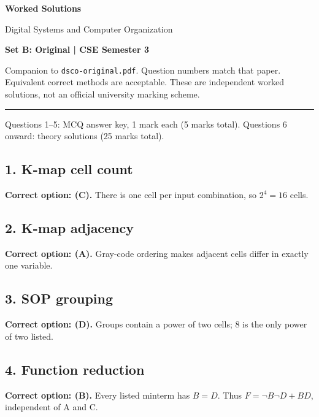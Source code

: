 \documentclass[11pt,a4paper]{article}
\begin{document}
{\LARGE\bfseries Worked Solutions}\par{\large Digital Systems and Computer Organization}\par\textbf{Set B: Original | CSE Semester 3}\par
Companion to \texttt{dsco-original.pdf}. Question numbers match that paper. Equivalent correct methods are acceptable. These are independent worked solutions, not an official university marking scheme.\par\medskip\hrule\medskip
Questions 1--5: MCQ answer key, 1 mark each (5 marks total). Questions 6 onward: theory solutions (25 marks total).\par
\noindent\begin{minipage}{\linewidth}\subsection*{1. K-map cell count}
\textbf{Correct option: (C).} There is one cell per input combination, so $2^4=16$ cells.
\end{minipage}\par\medskip
\noindent\begin{minipage}{\linewidth}\subsection*{2. K-map adjacency}
\textbf{Correct option: (A).} Gray-code ordering makes adjacent cells differ in exactly one variable.
\end{minipage}\par\medskip
\noindent\begin{minipage}{\linewidth}\subsection*{3. SOP grouping}
\textbf{Correct option: (D).} Groups contain a power of two cells; 8 is the only power of two listed.
\end{minipage}\par\medskip
\noindent\begin{minipage}{\linewidth}\subsection*{4. Function reduction}
\textbf{Correct option: (B).} Every listed minterm has $B=D$. Thus $F=\neg B\neg D+BD$, independent of A and C.
\end{minipage}\par\medskip
\end{document}
